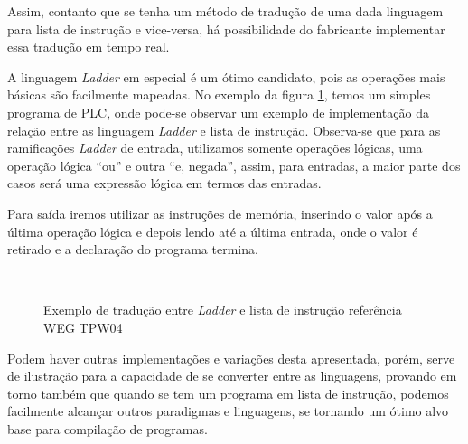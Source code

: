 Assim, contanto que se tenha um método de tradução de uma dada linguagem para lista de instrução e vice-versa, há possibilidade do fabricante implementar essa tradução em tempo real.

A linguagem \textit{Ladder} em especial é um ótimo candidato, pois as operações mais básicas são facilmente mapeadas. No exemplo da figura \ref{fig:illadder}, temos um simples programa de PLC, onde pode-se observar um exemplo de implementação da relação entre as linguagem \textit{Ladder} e lista de instrução. Observa-se que para as ramificações \textit{Ladder} de entrada, utilizamos somente operações lógicas, uma operação lógica ``ou'' e outra ``e, negada'', assim, para entradas, a maior parte dos casos será uma expressão lógica em termos das entradas.

Para saída iremos utilizar as instruções de memória, inserindo o valor após a última operação lógica e depois lendo até a última entrada, onde o valor é retirado e a declaração do programa termina.

\begin{figure}[ht]
	\centering
	\caption{Exemplo de tradução entre \textit{Ladder} e lista de instrução referência WEG TPW04}
	\\
	\label{fig:illadder}
\end{figure}

Podem haver outras implementações e variações desta apresentada, porém, serve de ilustração para a capacidade de se converter entre as linguagens, provando em torno também que quando se tem um programa em lista de instrução, podemos facilmente alcançar outros paradigmas e linguagens, se tornando um ótimo alvo base para compilação de programas.



